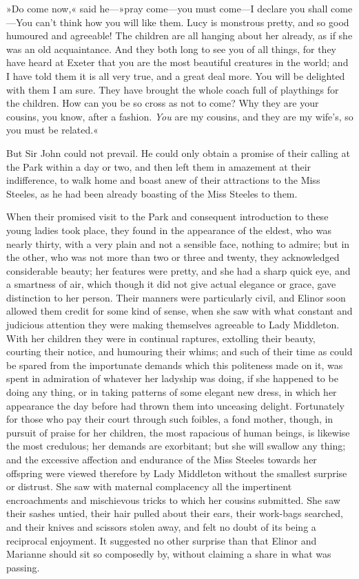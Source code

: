 »Do come now,« said he—»pray come—you must come—I declare you shall come—You can’t think how you will like them. Lucy is monstrous pretty, and so good humoured and agreeable! The children are all hanging about her already, as if she was an old acquaintance. And they both long to see you of all things, for they have heard at Exeter that you are the most beautiful creatures in the world; and I have told them it is all very true, and a great deal more. You will be delighted with them I am sure. They have brought the whole coach full of playthings for the children. How can you be so cross as not to come? Why they are your cousins, you know, after a fashion. \textit{You} are my cousins, and they are my wife’s, so you must be related.«

But Sir John could not prevail. He could only obtain a promise of their calling at the Park within a day or two, and then left them in amazement at their indifference, to walk home and boast anew of their attractions to the Miss Steeles, as he had been already boasting of the Miss Steeles to them.

When their promised visit to the Park and consequent introduction to these young ladies took place, they found in the appearance of the eldest, who was nearly thirty, with a very plain and not a sensible face, nothing to admire; but in the other, who was not more than two or three and twenty, they acknowledged considerable beauty; her features were pretty, and she had a sharp quick eye, and a smartness of air, which though it did not give actual elegance or grace, gave distinction to her person. Their manners were particularly civil, and Elinor soon allowed them credit for some kind of sense, when she saw with what constant and judicious attention they were making themselves agreeable to Lady Middleton. With her children they were in continual raptures, extolling their beauty, courting their notice, and humouring their whims; and such of their time as could be spared from the importunate demands which this politeness made on it, was spent in admiration of whatever her ladyship was doing, if she happened to be doing any thing, or in taking patterns of some elegant new dress, in which her appearance the day before had thrown them into unceasing delight. Fortunately for those who pay their court through such foibles, a fond mother, though, in pursuit of praise for her children, the most rapacious of human beings, is likewise the most credulous; her demands are exorbitant; but she will swallow any thing; and the excessive affection and endurance of the Miss Steeles towards her offspring were viewed therefore by Lady Middleton without the smallest surprise or distrust. She saw with maternal complacency all the impertinent encroachments and mischievous tricks to which her cousins submitted. She saw their sashes untied, their hair pulled about their ears, their work-bags searched, and their knives and scissors stolen away, and felt no doubt of its being a reciprocal enjoyment. It suggested no other surprise than that Elinor and Marianne should sit so composedly by, without claiming a share in what was passing.

